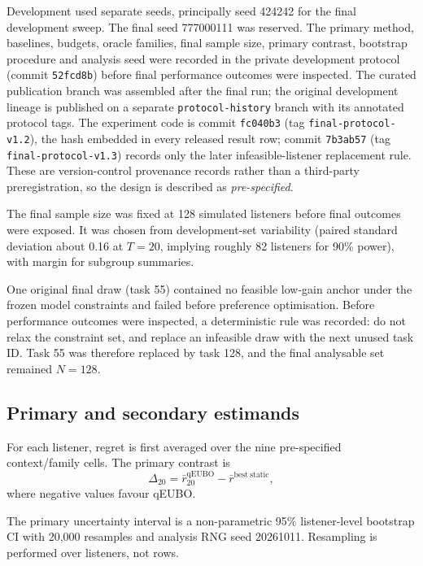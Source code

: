 \documentclass[preprint,12pt]{elsarticle}
\begin{document}
Development used separate seeds, principally seed 424242 for the final development sweep. The final seed 777000111 was reserved. The primary method, baselines, budgets, oracle families, final sample size, primary contrast, bootstrap procedure and analysis seed were recorded in the private development protocol (commit \texttt{52fcd8b}) before final performance outcomes were inspected. The curated publication branch was assembled after the final run; the original development lineage is published on a separate \texttt{protocol-history} branch with its annotated protocol tags. The experiment code is commit \texttt{fc040b3} (tag \texttt{final-protocol-v1.2}), the hash embedded in every released result row; commit \texttt{7b3ab57} (tag \texttt{final-protocol-v1.3}) records only the later infeasible-listener replacement rule. These are version-control provenance records rather than a third-party preregistration, so the design is described as \emph{pre-specified}.

The final sample size was fixed at 128 simulated listeners before final outcomes were exposed. It was chosen from development-set variability (paired standard deviation about 0.16 at $T=20$, implying roughly 82 listeners for 90\% power), with margin for subgroup summaries.

One original final draw (task 55) contained no feasible low-gain anchor under the frozen model constraints and failed before preference optimisation. Before performance outcomes were inspected, a deterministic rule was recorded: do not relax the constraint set, and replace an infeasible draw with the next unused task ID. Task 55 was therefore replaced by task 128, and the final analysable set remained $N=128$.

\subsection{Primary and secondary estimands}

For each listener, regret is first averaged over the nine pre-specified context/family cells. The primary contrast is
\begin{equation}
 \Delta_{20}=\bar r^{\mathrm{qEUBO}}_{20}-\bar r^{\mathrm{best\ static}},
\end{equation}
where negative values favour qEUBO.

The primary uncertainty interval is a non-parametric 95\% listener-level bootstrap CI with 20,000 resamples and analysis RNG seed 20261011. Resampling is performed over listeners, not rows.
\end{document}
